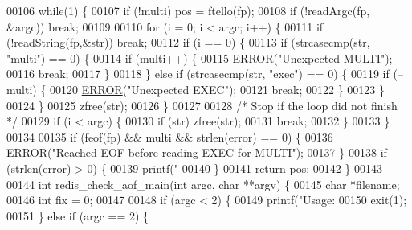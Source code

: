 \begin{DoxyCode}
{{{{00106     \textcolor{keywordflow}{while}(1) \{
00107         \textcolor{keywordflow}{if} (!multi) pos = ftello(fp);
00108         \textcolor{keywordflow}{if} (!readArgc(fp, &argc)) \textcolor{keywordflow}{break};
00109 
00110         \textcolor{keywordflow}{for} (i = 0; i < argc; i++) \{
00111             \textcolor{keywordflow}{if} (!readString(fp,&str)) \textcolor{keywordflow}{break};
00112             \textcolor{keywordflow}{if} (i == 0) \{
00113                 \textcolor{keywordflow}{if} (strcasecmp(str, \textcolor{stringliteral}{"multi"}) == 0) \{
00114                     \textcolor{keywordflow}{if} (multi++) \{
00115                         \hyperlink{redis-check-aof_8c_a02ce8a968600d004ba60858425c46307}{ERROR}(\textcolor{stringliteral}{"Unexpected MULTI"});
00116                         \textcolor{keywordflow}{break};
00117                     \}
00118                 \} \textcolor{keywordflow}{else} \textcolor{keywordflow}{if} (strcasecmp(str, \textcolor{stringliteral}{"exec"}) == 0) \{
00119                     \textcolor{keywordflow}{if} (--multi) \{
00120                         \hyperlink{redis-check-aof_8c_a02ce8a968600d004ba60858425c46307}{ERROR}(\textcolor{stringliteral}{"Unexpected EXEC"});
00121                         \textcolor{keywordflow}{break};
00122                     \}
00123                 \}
00124             \}
00125             zfree(str);
00126         \}
00127 
00128         \textcolor{comment}{/* Stop if the loop did not finish */}
00129         \textcolor{keywordflow}{if} (i < argc) \{
00130             \textcolor{keywordflow}{if} (str) zfree(str);
00131             \textcolor{keywordflow}{break};
00132         \}
00133     \}
00134 
00135     \textcolor{keywordflow}{if} (feof(fp) && multi && strlen(error) == 0) \{
00136         \hyperlink{redis-check-aof_8c_a02ce8a968600d004ba60858425c46307}{ERROR}(\textcolor{stringliteral}{"Reached EOF before reading EXEC for MULTI"});
00137     \}
00138     \textcolor{keywordflow}{if} (strlen(error) > 0) \{
00139         printf(\textcolor{stringliteral}{"%
00140     \}
00141     \textcolor{keywordflow}{return} pos;
00142 \}
00143 
00144 \textcolor{keywordtype}{int} redis\_check\_aof\_main(\textcolor{keywordtype}{int} argc, \textcolor{keywordtype}{char} **argv) \{
00145     \textcolor{keywordtype}{char} *filename;
00146     \textcolor{keywordtype}{int} fix = 0;
00147 
00148     \textcolor{keywordflow}{if} (argc < 2) \{
00149         printf(\textcolor{stringliteral}{"Usage: %
00150         exit(1);
00151     \} \textcolor{keywordflow}{else} \textcolor{keywordflow}{if} (argc == 2) \{
}}}}}}
\end{DoxyCode}
